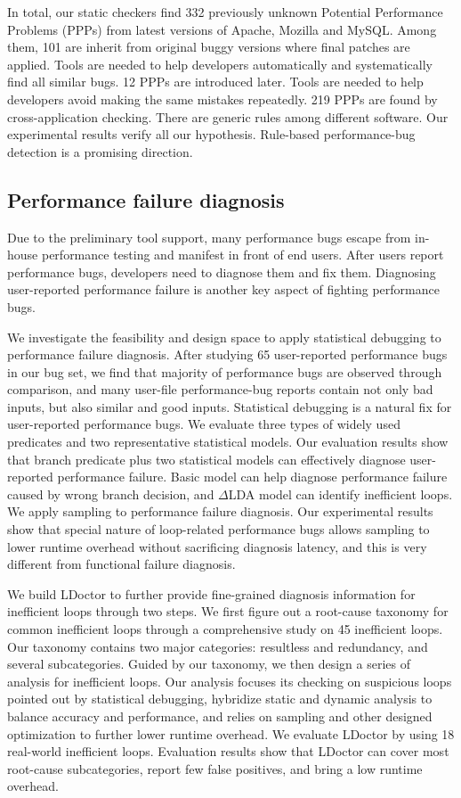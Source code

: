 In total, our static checkers find 332 previously unknown Potential Performance Problems (PPPs) 
from latest versions of Apache, Mozilla and MySQL. 
Among them, 101 are inherit from original buggy versions where final patches are applied. 
Tools are needed to help developers automatically and systematically find all similar bugs.
12 PPPs are introduced later. Tools are needed to help developers avoid making the same mistakes repeatedly. 
219 PPPs are found by cross-application checking. 
There are generic rules among different software.  
Our experimental results verify all our hypothesis. 
Rule-based performance-bug detection is a promising direction. 

\subsection{Performance failure diagnosis}

Due to the preliminary tool support, many performance bugs escape from in-house performance testing and manifest in front of end users. 
After users report performance bugs, developers need to diagnose them and fix them.
Diagnosing user-reported performance failure is another key aspect of fighting performance bugs. 

We investigate the feasibility and design space to apply statistical debugging to performance failure diagnosis.
After studying 65 user-reported performance bugs in our bug set, 
we find that majority of performance bugs are observed through comparison, 
and many user-file performance-bug reports contain not only bad inputs, but also similar and good inputs.
Statistical debugging is a natural fix for user-reported performance bugs. 
We evaluate three types of widely used predicates and two representative statistical models. 
Our evaluation results show that branch predicate plus two statistical models can effectively diagnose user-reported performance failure. 
Basic model can help diagnose performance failure caused by wrong branch decision, and $\Delta $LDA model can identify inefficient loops.  
We apply sampling to performance failure diagnosis. Our experimental results show that
special nature of loop-related performance bugs allows sampling to lower runtime overhead without sacrificing diagnosis latency, 
and this is very different from functional failure diagnosis.

We build LDoctor to further provide fine-grained diagnosis information for inefficient loops through two steps. 
We first figure out a root-cause taxonomy for common inefficient loops through a comprehensive study on 45 inefficient loops. 
Our taxonomy contains two major categories: resultless and redundancy, and several subcategories. 
Guided by our taxonomy, we then design a series of analysis for inefficient loops. 
Our analysis 
focuses its checking on suspicious loops pointed out by statistical debugging, 
hybridize static and dynamic analysis to balance accuracy and performance, 
and relies on sampling and other designed optimization to further lower runtime overhead. 
We evaluate LDoctor by using 18 real-world inefficient loops. 
Evaluation results show that LDoctor can cover most root-cause subcategories, 
report few false positives, and bring a low runtime overhead. 
